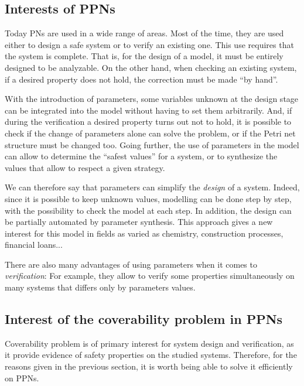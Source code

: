 \subsection{Interests of \acp{PPN}}


Today \acp{PN} are used in a wide range of areas. Most of the time, they are used either to design a safe system or to verify an existing one. This use requires that the system is complete. That is, for the design of a model, it must be entirely designed to be analyzable. On the other hand, when checking an existing system, if a desired property does not hold, the correction must be made ``by hand''.

With the introduction of parameters, some variables unknown at the design stage can be integrated into the model without having to set them arbitrarily. And, if during the verification a desired property turns out not to hold, it is possible to check if the change of parameters alone can solve the problem, or if the Petri net structure must be changed too. Going further, the use of parameters in the model can allow to determine the ``safest values'' for a system, or to synthesize the values that allow to respect a given strategy.

We can therefore say that parameters can simplify the \emph{design} of a system. Indeed, since it is possible to keep unknown values, modelling can be done step by step, with the possibility to check the model at each step.
In addition, the design can be partially automated by parameter synthesis.
This approach gives a new interest for this model in fields as varied as chemistry, construction processes, financial loans...

There are also many advantages of using parameters when it comes to \emph{verification}:
For example, they allow to verify some properties simultaneously on many systems that differs only by parameters values.

\subsection{Interest of the coverability problem in \acp{PPN}}


Coverability problem is of primary interest for system design and verification, as it provide evidence of safety properties on the studied systems. Therefore, for the reasons given in the previous section, it is worth being able to solve it efficiently on \acp{PPN}.

